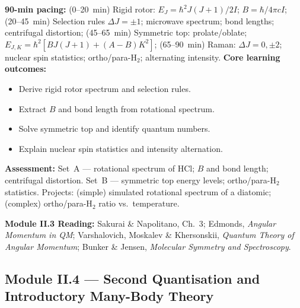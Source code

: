 \documentclass[11pt,a4paper]{article}
\begin{document}
\medskip

\begin{tcolorbox}[modulebox, title={Module~II.3 --- Lecture L12: Rotational Spectroscopy}]
\textbf{90-min pacing:} (0--20~min) Rigid rotor: $E_J=\hbar^2J(J+1)/2I$; $B=\hbar/4\pi cI$; (20--45~min) Selection rules $\Delta J=\pm1$; microwave spectrum; bond lengths; centrifugal distortion; (45--65~min) Symmetric top: prolate/oblate; $E_{J,K}=\hbar^2[BJ(J+1)+(A-B)K^2]$; (65--90~min) Raman: $\Delta J=0,\pm2$; nuclear spin statistics; ortho/para-H$_2$; alternating intensity.
\medskip\textbf{Core learning outcomes:}
\begin{itemize}[leftmargin=1.4em,topsep=2pt,itemsep=1pt]
  \item Derive rigid rotor spectrum and selection rules.
  \item Extract $B$ and bond length from rotational spectrum.
  \item Solve symmetric top and identify quantum numbers.
  \item Explain nuclear spin statistics and intensity alternation.
\end{itemize}
\medskip\textbf{Assessment:}
Set~A --- rotational spectrum of HCl; $B$ and bond length; centrifugal distortion.
Set~B --- symmetric top energy levels; ortho/para-H$_2$ statistics.
Projects: (simple) simulated rotational spectrum of a diatomic; (complex) ortho/para-H$_2$ ratio vs.\ temperature.
\end{tcolorbox}

\begin{tcolorbox}[highlightbox]
\textbf{Module II.3 Reading:} Sakurai \& Napolitano, Ch.~3; Edmonds, \textit{Angular Momentum in QM}; Varshalovich, Moskalev \& Khersonskii, \textit{Quantum Theory of Angular Momentum}; Bunker \& Jensen, \textit{Molecular Symmetry and Spectroscopy}.
\end{tcolorbox}

\subsection{Module II.4 --- Second Quantisation and Introductory Many-Body Theory}
\label{sec:mod-II4}
\end{document}
